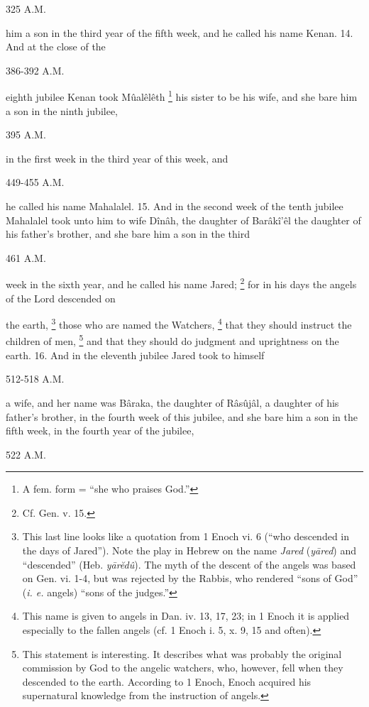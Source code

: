 325 A.M.

him a son in the third year of the fifth week, and he called his name Kenan. 14. And at the close of the

386-392 A.M.

eighth jubilee Kenan took Mûalêlêth \footnote{A fem. form = ``she who praises God.''} his sister to be his wife, and she bare him a son in the ninth jubilee,

395 A.M.

in the first week in the third year of this week, and

449-455 A.M.

he called his name Mahalalel. 15. And in the second week of the tenth jubilee Mahalalel took unto him to wife Dînâh, the daughter of Barâkî’êl the daughter of his father's brother, and she bare him a son in the third

461 A.M.

week in the sixth year, and he called his name Jared; \footnote{Cf. Gen. v. 15.} for in his days the angels of the Lord descended on

the earth, \footnote{This last line looks like a quotation from 1 Enoch vi. 6 (``who descended in the days of Jared''). Note the play in Hebrew on the name \emph{Jared} (\emph{yāred}) and ``descended'' (Heb. \emph{yārĕdû}). The myth of the descent of the angels was based on Gen. vi. 1-4, but was rejected by the Rabbis, who rendered ``sons of God'' (\emph{i. e.} angels) ``sons of the judges.''} those who are named the Watchers, \footnote{This name is given to angels in Dan. iv. 13, 17, 23; in 1 Enoch it is applied especially to the fallen angels (cf. 1 Enoch i. 5, x. 9, 15 and often).} that they should instruct the children of men, \footnote{This statement is interesting. It describes what was probably the original commission by God to the angelic watchers, who, however, fell when they descended to the earth. According to 1 Enoch, Enoch acquired his supernatural knowledge from the instruction of angels.} and that they should do judgment and uprightness on the earth. 16. And in the eleventh jubilee Jared took to himself

512-518 A.M.

a wife, and her name was Bâraka, the daughter of Râsûjâl, a daughter of his father's brother, in the fourth week of this jubilee, and she bare him a son in the fifth week, in the fourth year of the jubilee,

522 A.M.

